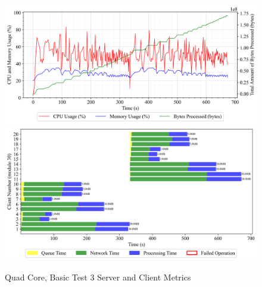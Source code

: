 \newpage
\begin{figure}[h!t]
    \begin{center}
    \label{Fig:A1.11}
    \caption{Quad Core, Basic Test 3 Server and Client Metrics}
    \includegraphics[width=\xLarge\textwidth]{Chapter4/Results/4c_results/arty-a7-4c_basic_3_20241003_133647.db_server_metrics.png}
    \includegraphics[width=\xLarge\textwidth]{Chapter4/Results/4c_results/arty-a7-4c_basic_3_20241003_133647.db_client_tasks.png}
    \end{center}
\end{figure}

